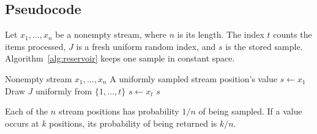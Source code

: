 \subsection{Pseudocode}

Let $x_1,\ldots,x_n$ be a nonempty stream, where $n$ is its length. The index $t$
counts the items processed, $J$ is a fresh uniform random index, and $s$ is the
stored sample. Algorithm~\ref{alg:reservoir} keeps one sample in constant space.

\begin{algorithm}[htbp]
\caption{Reservoir sampling of one item}
\label{alg:reservoir}
\begin{algorithmic}[1]
    \Require Nonempty stream $x_1,\ldots,x_n$
    \Ensure A uniformly sampled stream position's value
    \State $s\gets x_1$
        \State Draw $J$ uniformly from $\{1,\ldots,t\}$
            \State $s\gets x_t$
        \EndIf
    \EndFor
    \State \Return $s$
\end{algorithmic}
\end{algorithm}

\begin{remark}
Each of the $n$ stream positions has probability $1/n$ of being sampled. If a
value occurs at $k$ positions, its probability of being returned is $k/n$.
\end{remark}
